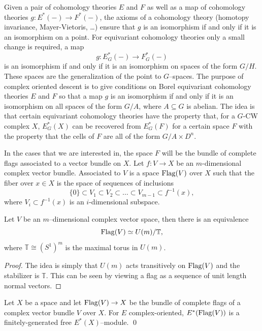Given a pair of cohomology theories \(E\) and \(F\) as well as a map of cohomology theories \(g \colon E^*(-) \rightarrow F^*(-)\), the axioms of a cohomology theory (homotopy invariance, Mayer-Vietoris, \ldots) ensure that \(g\) is an isomorphism if and only if it is an isomorphism on a point.
For equivariant cohomology theories only a small change is required, a map
\[
g \colon E_{G}^*(-) \rightarrow F_{G}^{*}(-)
\]
is an isomorphism if and only if it is an isomorphism on spaces of the form \(G/H\).
These spaces are the generalization of the point to \(G\)--spaces.
The purpose of complex oriented descent is to give conditions on Borel equivariant cohomology theories \(E\) and \(F\) so that a map \(g\) is an isomorphism if and only if it is an isomorphism on all spaces of the form \(G/A\), where \(A \subseteq G\) is abelian.
The idea is that certain equivariant cohomology theories have the property that, for a \(G\)-CW complex \(X\), \(E_{G}^*(X)\) can be recovered from \(E_{G}^*(F)\) for a certain space \(F\) with the property that the cells of \(F\) are all of the form \(G/A \times D^n\).

In the cases that we are interested in, the space \(F\) will be the bundle of complete flags associated to a vector bundle on \(X\).
Let \(f \colon V \rightarrow X\) be an \(m\)-dimensional complex vector bundle.
Associated to \(V\) is a space \(\operatorname{Flag}(V)\) over \(X\) such that the fiber over \(x \in X\) is the space of sequences of inclusions
\[
\{0\} \subset V_1 \subset V_2 \subset \ldots \subset V_{m-1} \subset f^{-1}(x),
\]
where \(V_i \subset f^{-1}(x)\) is an \(i\)-dimensional subspace.

\begin{lemma}
Let \(V\) be an \(m\)--dimensional complex vector space, then there is an equivalence
\[
\operatorname{Flag}(V) \simeq U(m)/\mathbb{T},
\]
where \(\mathbb{T} \cong (S^1)^m\) is the maximal torus in \(U(m)\).
\end{lemma}
\begin{proof}
The idea is simply that \(U(m)\) acts transitively on \(\operatorname{Flag}(V)\) and the stabilizer is \(\mathbb{T}\).
This can be seen by viewing a flag as a sequence of unit length normal vectors.
\end{proof}


\begin{proposition} \label{finitefreeflags}
Let \(X\) be a space and let \(\operatorname{Flag}(V) \rightarrow X\) be the bundle of complete flags of a complex vector bundle \(V\) over \(X\).
For \(E\) complex-oriented, \(E^*(\operatorname{Flag}(V))\) is a finitely-generated free \(E^*(X)\)--module.
\pushQED\qed \qedhere \popQED
\end{proposition}

